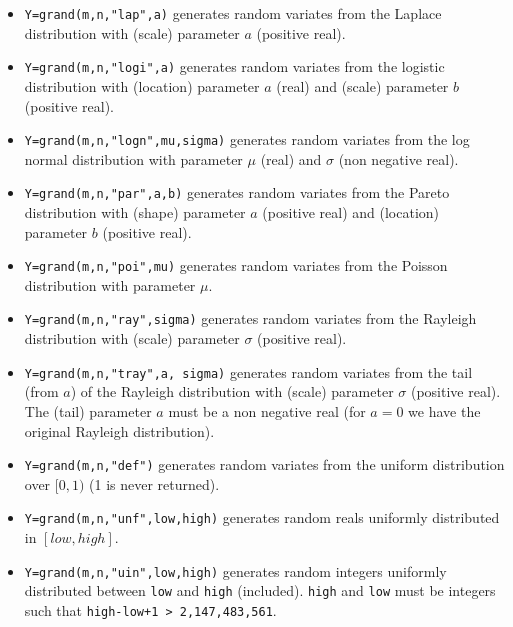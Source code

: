 \begin{description}
\begin{itemize}
\item {} 
  \verb!Y=grand(m,n,"lap",a)! generates random variates from the Laplace 
  distribution with (scale) parameter $a$ (positive real).
  
\item {} 
  \verb!Y=grand(m,n,"logi",a)! generates random variates from the logistic 
  distribution with (location) parameter $a$ (real) and (scale) parameter $b$ (positive real).
  
\item {} 
  \verb!Y=grand(m,n,"logn",mu,sigma)! generates random variates from the log normal
  distribution with parameter $\mu$ (real) and  $\sigma$ (non negative real).
  
\item {} 
  \verb!Y=grand(m,n,"par",a,b)! generates random variates from the Pareto 
  distribution with (shape) parameter $a$ (positive real) and (location) parameter $b$ (positive real).

\item {} \verb!Y=grand(m,n,"poi",mu)! generates random
  variates from the Poisson distribution with parameter $\mu$. 
  
\item {} 
  \verb!Y=grand(m,n,"ray",sigma)! generates random variates from the Rayleigh 
  distribution with (scale) parameter $\sigma$ (positive real).
  
\item {} 
  \verb!Y=grand(m,n,"tray",a, sigma)! generates random variates from the
  tail (from $a$) of the Rayleigh distribution with (scale) parameter 
  $\sigma$ (positive real). The (tail) parameter $a$ must be a non negative
  real (for $a=0$ we have the original Rayleigh distribution).

\item {} \verb!Y=grand(m,n,"def")! generates random variates from the uniform 
  distribution over $[0,1)$ (1 is never returned).

\item {} \verb!Y=grand(m,n,"unf",low,high)! generates random reals uniformly distributed 
    in $[low, high]$.

\item {} \verb!Y=grand(m,n,"uin",low,high)! generates random integers uniformly 
      distributed between \verb!low! and \verb!high! (included). \verb!high!
      and \verb!low! must be integers such that \verb!high-low+1 > 2,147,483,561!.


\end{itemize}
\end{description}
